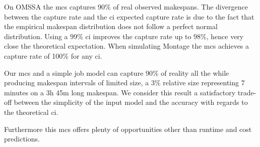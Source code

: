 \documentclass[10pt,conference,compsocconf]{IEEEtran}
\begin{document}
On OMSSA the  \ac{mcs} captures 90\% of real observed  makespans. The divergence
between the  capture rate and  the \ac{ci} expected capture  rate is due  to the
fact that the  empirical makespan distribution does not follow  a perfect normal
distribution. Using  a 99\% \ac{ci}  improves the capture  rate up to  98\%,
hence very close  the theoretical expectation.   When simulating Montage  the
\ac{mcs} achieves a capture rate of 100\% for any \ac{ci}.

Our \ac{mcs} and a simple job model can capture 90\% of reality all the while
producing makespan intervals of limited size, a 3\% relative size representing 7
minutes on a 3h 45m long makespan. We consider this result a satisfactory
trade-off between the simplicity of the input model and the accuracy with
regards to the theoretical \ac{ci}.

Furthermore this \ac{mcs} offers plenty of opportunities other than runtime and
cost predictions.
\end{document}

